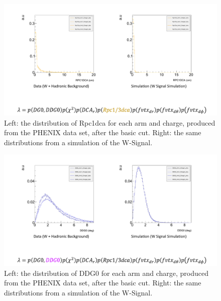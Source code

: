 \begin{figure}
  \centering
  \includegraphics[width=\linewidth,trim=4 4 4 4,clip]{./figures/pdf_rpc1dca.png}
  \caption{
    Left: the distribution of Rpc1dca for each arm and charge, produced from the
    PHENIX data set, after the basic cut. Right: the same distributions from a
    simulation of the W-Signal.
  }
  \label{fig:pdf_rpc1dca}
\end{figure}

\begin{figure}
  \centering
  \includegraphics[width=\linewidth,trim=4 4 4 4,clip]{./figures/pdf_DDG0.png}
  \caption{
    Left: the distribution of DDG0 for each arm and charge, produced from the
    PHENIX data set, after the basic cut. Right: the same distributions from a
    simulation of the W-Signal.
  }
  \label{fig:pdf_DDG0}
\end{figure}

